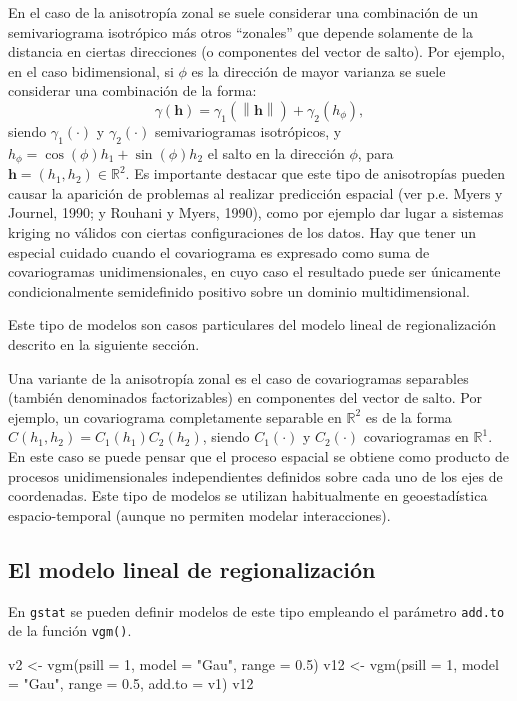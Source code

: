 \documentclass[
  spanish,
]{book}
\newenvironment{Shaded}{\begin{snugshade}}{\end{snugshade}}
\newcommand{\AttributeTok}[1]{\textcolor[rgb]{0.77,0.63,0.00}{#1}}
\newcommand{\DecValTok}[1]{\textcolor[rgb]{0.00,0.00,0.81}{#1}}
\newcommand{\FloatTok}[1]{\textcolor[rgb]{0.00,0.00,0.81}{#1}}
\newcommand{\FunctionTok}[1]{\textcolor[rgb]{0.00,0.00,0.00}{#1}}
\newcommand{\NormalTok}[1]{#1}
\newcommand{\OtherTok}[1]{\textcolor[rgb]{0.56,0.35,0.01}{#1}}
\newcommand{\StringTok}[1]{\textcolor[rgb]{0.31,0.60,0.02}{#1}}
\theoremstyle{break}
\begin{document}
En el caso de la anisotropía zonal se suele considerar una combinación de un semivariograma isotrópico más otros ``zonales'' que depende solamente de la distancia en ciertas direcciones (o componentes del vector de salto).
Por ejemplo, en el caso bidimensional, si \(\phi\) es la dirección de mayor varianza se suele considerar una combinación de la forma:
\[\gamma(\mathbf{h})=\gamma_1 (\left\| \mathbf{h}\right\|)+\gamma_2(h_{\phi }),\]
siendo \(\gamma_1 (\cdot)\) y \(\gamma_2 (\cdot)\) semivariogramas isotrópicos, y \(h_{\phi } =\cos (\phi)h_1 +\sin(\phi)h_2\) el salto en la dirección \(\phi\), para \(\mathbf{h}=(h_1 ,h_2)\in \mathbb{R} ^{2}\).
Es importante destacar que este tipo de anisotropías pueden causar la aparición de problemas al realizar predicción espacial (ver p.e. Myers y Journel, 1990; y Rouhani y Myers, 1990), como por ejemplo dar lugar a sistemas kriging no válidos con ciertas configuraciones de los datos.
Hay que tener un especial cuidado cuando el covariograma es expresado como suma de covariogramas unidimensionales, en cuyo caso el resultado puede ser únicamente condicionalmente semidefinido positivo sobre un dominio multidimensional.

Este tipo de modelos son casos particulares del modelo lineal de regionalización descrito en la siguiente sección.

Una variante de la anisotropía zonal es el caso de covariogramas separables (también denominados factorizables) en componentes del vector de salto.
Por ejemplo, un covariograma completamente separable en \(\mathbb{R}^2\) es de la forma \(C(h_1, h_2)= C_1(h_1)C_2(h_2)\), siendo \(C_1(\cdot)\) y \(C_2(\cdot)\) covariogramas en \(\mathbb{R}^{1}\).
En este caso se puede pensar que el proceso espacial se obtiene como producto de procesos unidimensionales independientes definidos sobre cada uno de los ejes de coordenadas.
Este tipo de modelos se utilizan habitualmente en geoestadística espacio-temporal (aunque no permiten modelar interacciones).

\hypertarget{vario-lin-reg}{%
\subsection{El modelo lineal de regionalización}\label{vario-lin-reg}}

En \texttt{gstat} se pueden definir modelos de este tipo empleando el parámetro \texttt{add.to} de la función \texttt{vgm()}.

\begin{Shaded}
\begin{Highlighting}[]
\NormalTok{v2 }\OtherTok{\textless{}{-}} \FunctionTok{vgm}\NormalTok{(}\AttributeTok{psill =} \DecValTok{1}\NormalTok{, }\AttributeTok{model =} \StringTok{"Gau"}\NormalTok{, }\AttributeTok{range =} \FloatTok{0.5}\NormalTok{)}
\NormalTok{v12 }\OtherTok{\textless{}{-}} \FunctionTok{vgm}\NormalTok{(}\AttributeTok{psill =} \DecValTok{1}\NormalTok{, }\AttributeTok{model =} \StringTok{"Gau"}\NormalTok{, }\AttributeTok{range =} \FloatTok{0.5}\NormalTok{, }\AttributeTok{add.to =}\NormalTok{ v1)}
\NormalTok{v12}
\end{Highlighting}
\end{Shaded}
\end{document}
